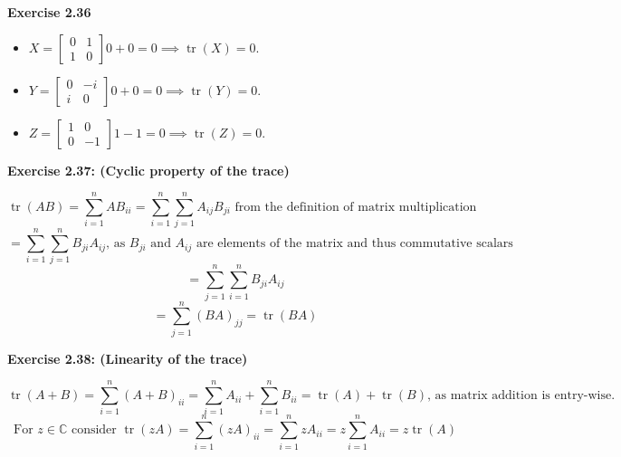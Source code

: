 \documentclass{article}
\begin{document}
\begin{framed}
    \noindent \textbf{Exercise 2.36}
    
    \medskip
    
    \begin{itemize}
        \item $X = \begin{bmatrix} 0 & 1 \\ 1 & 0\end{bmatrix} 0 + 0 = 0 \implies \operatorname{tr}(X) = 0  $.
        \item $Y = \begin{bmatrix} 0 & -i \\ i & 0\end{bmatrix} 0 + 0 = 0 \implies \operatorname{tr}(Y) = 0  $.
        \item $Z = \begin{bmatrix} 1 & 0 \\0 & -1\end{bmatrix} 1 - 1 = 0 \implies \operatorname{tr}(Z) = 0 $.
    \end{itemize}
    
\end{framed}

\bigskip

\begin{framed}
    \noindent \textbf{Exercise 2.37: (Cyclic property of the trace)}
    
    \medskip

    $$
    \operatorname{tr}(AB) = \sum_{i=1}^{n}{AB}_{ii} = \sum_{i=1}^{n}\sum_{j=1}^{n}A_{ij}B_{ji} \text{ from the definition of matrix multiplication}
    $$
    $$
    = \sum_{i=1}^{n}\sum_{j=1}^{n}{B_{ji}A_{ij}} \text{, as } B_{ji} \text{ and } A_{ij} \text{ are elements of the matrix and thus commutative scalars}
    $$
    $$
    = \sum_{j=1}^{n}\sum_{i=1}^{n}{B_{ji}A_{ij}}
    $$
    $$
    = \sum_{j=1}^{n}(BA)_{jj} = \operatorname{tr}(BA)
    $$
    
    
\end{framed}

\bigskip

\begin{framed}
    \noindent \textbf{Exercise 2.38: (Linearity of the trace)}
    
    \medskip

    $$
    \operatorname{tr}(A + B) = \sum_{i=1}^{n}{(A + B)_{ii}} = \sum_{i=1}^{n}A_{ii} + \sum_{i=1}^{n}B_{ii} = \operatorname{tr}(A) + \operatorname{tr}(B) \text{, as matrix addition is entry-wise}.
    $$
    $$
    \text{For } z \in \mathbb{C} \text{ consider } \operatorname{tr}(zA) = 
    \sum_{i=1}^{n}{(zA)_{ii}} = \sum_{i=1}^{n}{zA_{ii}} = z\sum_{i=1}^{n}{A_{ii}} = z\operatorname{tr}(A)
    $$
    
\end{framed}
\end{document}
